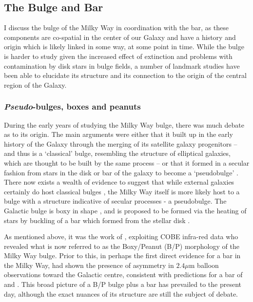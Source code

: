 \subsection{The Bulge and Bar}

I discuss the bulge of the Milky Way in coordination with the bar, as these components are co-spatial in the center of our Galaxy and have a history and origin which is likely linked in some way, at some point in time. While the bulge is harder to study given the increased effect of extinction and problems with contamination by disk stars in bulge fields, a number of landmark studies have been able to elucidate its structure and its connection to the origin of the central region of the Galaxy.

\subsubsection{\emph{Pseudo}-bulges, boxes and peanuts}
During the early years of studying the Milky Way bulge, there was much debate as to its origin. The main arguments were either that it built up in the early history of the Galaxy through the merging of its satellite galaxy progenitors -- and thus is a `classical' bulge, resembling the structure of elliptical galaxies, which are thought to be built by the same process -- or that it formed in a secular fashion from stars in the disk or bar of the galaxy to become a `pseudobulge' \citep[a useful summary of these definitions is provided in Section 1.1 of][]{2004ARA&A..42..603K}. There now exists a wealth of evidence to suggest that while external galaxies certainly do host classical bulges \citep[e.g.][]{2009MNRAS.393.1531G}, the Milky Way itself is more likely host to a bulge with a structure indicative of secular processes - a pseudobulge. The Galactic bulge is boxy in shape \citep[e.g][]{1995ApJ...445..716D}, and is proposed to be formed via the heating of stars by buckling of a bar which formed from the stellar disk \citep[e.g.][]{1981A&A....96..164C,1991Natur.352..411R}.

As mentioned above, it was the work of \citet{1995ApJ...445..716D}, exploiting COBE infra-red data who revealed what is now referred to as the Boxy/Peanut (B/P) morphology of the Milky Way bulge. Prior to this, in perhaps the first direct evidence for a bar in the Milky Way, \citet{1991ApJ...379..631B} had shown the presence of asymmetry in $2.4 \mu$m balloon observations \citep{1982AIPC...83...48M} toward the Galactic centre, consistent with predictions for a bar of \citet{1979A&AS...37..403S} and \citet{1980ApJ...236..779L}. This broad picture of a B/P bulge plus a bar has prevailed to the present day, although the exact nuances of its structure are still the subject of debate.

